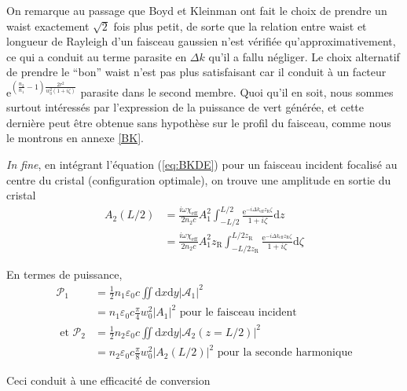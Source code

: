 \documentclass[11pt,a4paper] { article}
\newcommand{\zr}{z_\mathsc{R}}
\renewcommand{\P}{\mathscr{P}}
\newcommand{\A}{\mathcal{A}}
\newcommand{\e}[1]{\text{e}^{#1}}
\newcommand{\mathsc}[1]{\mathrm{\scriptscriptstyle {#1}}}
\begin{document}
On remarque au passage que Boyd et Kleinman ont fait le choix de prendre un waist exactement $\sqrt{2}$ fois plus petit, de sorte que la relation entre waist et longueur de Rayleigh d'un faisceau gaussien n'est vérifiée qu'approximativement, ce qui a conduit au terme parasite en $\Delta k$ qu'il a fallu négliger. Le choix alternatif de prendre le ``bon'' waist n'est pas plus satisfaisant car il conduit à un facteur $\e{ \left(\frac{n_2}{n_1}-1\right) \frac{2 r^2}{w_0^2(1+i\zeta)}}$ parasite dans le second membre. Quoi qu'il en soit, nous sommes surtout intéressés par l'expression de la puissance de vert générée, et cette dernière peut être obtenue sans hypothèse sur le profil du faisceau, comme nous le montrons en annexe \ref{BK}. 

\textit{In fine}, en intégrant l'équation (\ref{eq:BKDE}) pour un faisceau incident focalisé au centre du cristal (configuration optimale), on trouve une amplitude en sortie du cristal
\begin{align} 
	A_2(L/2) &= \frac{i\omega \chi_\mathsc{eff}}{2 n_2 c} A_1^2 \int_{-L/2}^{L/2} \frac{\e{-i\Delta k_\mathsc{eff} \zr \zeta}}{1+i\zeta} \mathrm dz \\
	&= \frac{i\omega \chi_\mathsc{eff}}{2 n_2 c} A_1^2 \zr \int_{-L/2\zr}^{L/2\zr} \frac{\e{-i\Delta k_\mathsc{eff} \zr \zeta}}{1+i\zeta} \mathrm d\zeta
\end{align}

En termes de puissance,
\begin{align} 
	\P_1 &= \frac12 n_1 \varepsilon_0 c \iint \mathrm dx \mathrm dy |\A_1|^2 \\
	&= n_1\varepsilon_0c \frac\pi4 w_0^2 |A_1|^2 \text{ pour le faisceau incident } \\
	\text{ et } \P_2 &= \frac12 n_2 \varepsilon_0 c \iint \mathrm dx \mathrm dy |\A_2(z=L/2)|^2 \\
	&= n_2\varepsilon_0c \frac\pi8 w_0^2 |A_2(L/2)|^2 \text{ pour la seconde harmonique}
\end{align}

Ceci conduit à une efficacité de conversion
\end{document}
